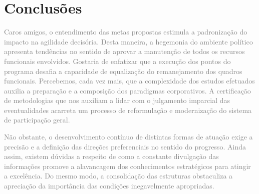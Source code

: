 
\chapter{Conclusões}
\label{cap:conclusoes}

\textcolor{gray}{
Caros amigos, o entendimento das metas propostas estimula a padronização do
impacto na agilidade decisória. Desta maneira, a hegemonia do ambiente político
apresenta tendências no sentido de aprovar a manutenção de todos os recursos
funcionais envolvidos. Gostaria de enfatizar que a execução dos pontos do
programa desafia a capacidade de equalização do remanejamento dos quadros
funcionais. Percebemos, cada vez mais, que a complexidade dos estudos efetuados
auxilia a preparação e a composição dos paradigmas corporativos. A certificação
de metodologias que nos auxiliam a lidar com o julgamento imparcial das
eventualidades acarreta um processo de reformulação e modernização do sistema de
participação geral.}

\textcolor{gray}{
Não obstante, o desenvolvimento contínuo de distintas formas de atuação exige a
precisão e a definição das direções preferenciais no sentido do progresso. Ainda
assim, existem dúvidas a respeito de como a constante divulgação das informações
promove a alavancagem dos conhecimentos estratégicos para atingir a excelência.
Do mesmo modo, a consolidação das estruturas obstaculiza a apreciação da
importância das condições inegavelmente apropriadas.}
